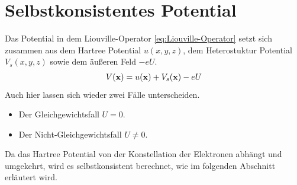 \section{Selbstkonsistentes Potential}
Das Potential in dem Liouville-Operator \eqref{eq:Liouville-Operator} setzt sich zusammen aus dem Hartree Potential $u(x,y,z)$, dem Heterostuktur Potential $V_s(x,y,z)$ sowie dem äußeren Feld $-eU$.
\begin{align}
  V(\vb{x}) = u(\vb{x}) + V_s(\vb{x}) - eU
\end{align}
Auch hier lassen sich wieder zwei Fälle unterscheiden.
\begin{itemize}
  \item Der Gleichgewichtsfall $U=0$. %
  \item Der Nicht-Gleichgewichtsfall $U\neq 0$. %
\end{itemize}
Da das Hartree Potential von der Konstellation der Elektronen abhängt und umgekehrt, wird es selbstkonsistent berechnet, wie im folgenden Abschnitt erläutert wird.

